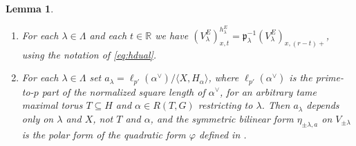 \documentclass{article}
\def\mf#1{\mathfrak{#1}}
\def\R{\mathbb{R}}
\def\<{\langle}
\def\>{\rangle}
\newtheorem{lem}[thm]{Lemma}
\theoremstyle{definition}
\numberwithin{equation}{subsection}
\renewcommand{\-}{\hyp{}}
\begin{document}
\begin{lem} \label{lem:bt-align1}
	\leavevmode
	\begin{enumerate}
		\item For each $\lambda \in \Lambda$ and each $t \in \R$ we have $(V_\lambda^E)_{x,t}^{h_\lambda^E}=\mf{p}_\lambda^{-1}(V_\lambda^E)_{x,(r-t)+}$, using the notation of \eqref{eq:hdual}. 
\item For each $\lambda \in \Lambda$ set $a_\lambda=\ell_{p'}(\alpha^\vee)/\<X,H_\alpha\>$, where $\ell_{p'}(\alpha^\vee)$ is the prime-to-$p$ part of the normalized square length of $\alpha^\vee$, for an arbitrary tame maximal torus $T \subseteq H$ and $\alpha \in R(T,G)$ restricting to $\lambda$. Then $a_\lambda$ depends only on $\lambda$ and $X$, not $T$ and $\alpha$, and the symmetric bilinear form $\eta_{\pm\lambda,a}$ on $V_{\pm\lambda}$ is the polar form of the quadratic form $\varphi$ defined in \cite[Definitions 5.4.5, 5.4.8]{FKS23}.
	\end{enumerate}
\end{lem}
\end{document}
